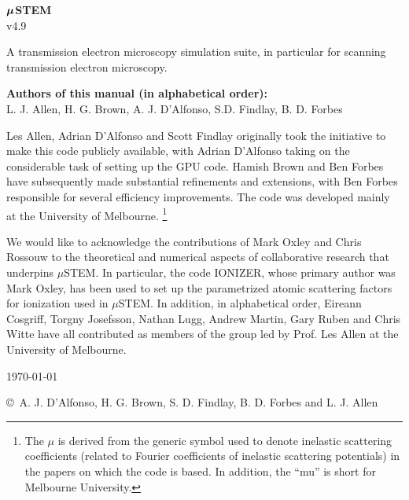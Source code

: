 \documentclass[12pt,a4paper]{article}
\newcommand{\bbox}[1]{{\mbox{\boldmath{$#1$}}}}
\begin{document}


\begin{center}

\vspace*{5mm}

{\Huge{\bf $\bbox{\mu}$STEM}\\ v4.9}\\ 

\vspace{15mm} 

{\Large A transmission electron microscopy simulation suite, in particular for scanning transmission electron microscopy.}\\

\vspace{10mm}

{\bf Authors of this manual (in alphabetical order):}\\
L. J. Allen,  H. G. Brown, A. J. D'Alfonso, S.D. Findlay, B. D. Forbes 

\end{center}


Les Allen, Adrian D'Alfonso and Scott Findlay  originally took the initiative to make this code publicly available, with Adrian D'Alfonso taking on the considerable task of setting up the GPU code. Hamish Brown and Ben Forbes have subsequently made substantial refinements and extensions, with Ben Forbes responsible for several efficiency improvements. The code was developed mainly at the University of Melbourne. \footnote{ The $\mu$ is derived from the generic symbol used to denote inelastic scattering coefficients (related to Fourier coefficients of inelastic scattering potentials) in the papers on which the code is based. In addition, the ``mu'' is short for Melbourne University.}

We would like to acknowledge the contributions of Mark Oxley and Chris Rossouw to the theoretical and numerical aspects of collaborative research that underpins $\mu$STEM.
In particular, the code IONIZER, whose primary author was Mark Oxley, has been used to set up the parametrized atomic scattering factors for ionization used in $\mu$STEM. 
In addition, in alphabetical order, Eireann Cosgriff, Torgny Josefsson, Nathan Lugg, Andrew Martin, Gary Ruben and Chris Witte have all contributed as members of the group led by Prof. Les Allen at the University of Melbourne. 
\begin{center}
\vspace{10mm}

{\today}

\vspace*{5 mm}

{\small \copyright $\,$  A. J. D'Alfonso, H. G. Brown, S. D. Findlay, B. D. Forbes and L. J. Allen}


\end{center}
\end{document}
